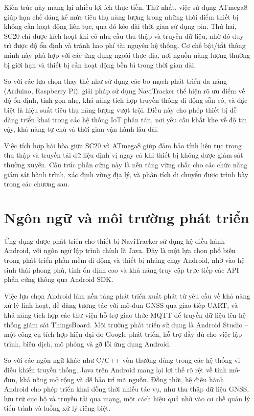\documentclass[../DoAn.tex]{subfiles}
\begin{document}
Kiến trúc này mang lại nhiều lợi ích thực tiễn. Thứ nhất, việc sử dụng ATmega8 giúp hạn chế đáng kể mức tiêu thụ năng lượng trong những thời điểm thiết bị không cần hoạt động liên tục, qua đó kéo dài thời gian sử dụng pin. Thứ hai, SC20 chỉ được kích hoạt khi có nhu cầu thu thập và truyền dữ liệu, nhờ đó duy trì được độ ổn định và tránh hao phí tài nguyên hệ thống. Cơ chế bật/tắt thông minh này phù hợp với các ứng dụng ngoài thực địa, nơi nguồn năng lượng thường bị giới hạn và thiết bị cần hoạt động bền bỉ trong thời gian dài.

So với các lựa chọn thay thế như sử dụng các bo mạch phát triển đa năng (Arduino, Raspberry Pi), giải pháp sử dụng NaviTracker thể hiện rõ ưu điểm về độ ổn định, tính gọn nhẹ, khả năng tích hợp truyền thông di động sẵn có, và đặc biệt là hiệu suất tiêu thụ năng lượng vượt trội. Điều này cho phép thiết bị dễ dàng triển khai trong các hệ thống IoT phân tán, nơi yêu cầu khắt khe về độ tin cậy, khả năng tự chủ và thời gian vận hành lâu dài.

Việc tích hợp hài hòa giữa SC20 và ATmega8 giúp đảm bảo tính liên tục trong thu thập và truyền tải dữ liệu định vị ngay cả khi thiết bị không được giám sát thường xuyên. Cấu trúc phần cứng này là nền tảng vững chắc cho các chức năng giám sát hành trình, xác định vùng địa lý, và phân tích di chuyển được trình bày trong các chương sau.
\section{Ngôn ngữ và môi trường phát triển}
\label{section:3.2}
Ứng dụng được phát triển cho thiết bị NaviTracker sử dụng hệ điều hành Android, với ngôn ngữ lập trình chính là Java. Đây là một lựa chọn phổ biến trong phát triển phần mềm di động và thiết bị nhúng chạy Android, nhờ vào hệ sinh thái phong phú, tính ổn định cao và khả năng truy cập trực tiếp các API phần cứng thông qua Android SDK.

Việc lựa chọn Android làm nền tảng phát triển xuất phát từ yêu cầu về khả năng xử lý linh hoạt, dễ dàng tương tác với mô-đun GNSS qua giao tiếp UART, và khả năng tích hợp các thư viện hỗ trợ giao thức MQTT để truyền dữ liệu lên hệ thống giám sát ThingsBoard. Môi trường phát triển sử dụng là Android Studio – một công cụ tích hợp hiện đại do Google phát triển, hỗ trợ đầy đủ cho việc lập trình, biên dịch, mô phỏng và gỡ lỗi ứng dụng Android.

So với các ngôn ngữ khác như C/C++ vốn thường dùng trong các hệ thống vi điều khiển truyền thống, Java trên Android mang lại lợi thế rõ rệt về tính mô-đun, khả năng mở rộng và dễ bảo trì mã nguồn. Đồng thời, hệ điều hành Android cho phép triển khai đồng thời nhiều tác vụ, như thu thập dữ liệu GNSS, lưu trữ cục bộ và truyền tải qua mạng, một cách hiệu quả nhờ vào cơ chế quản lý tiến trình và luồng xử lý riêng biệt.
\end{document}
